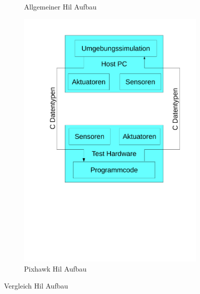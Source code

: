 \begin{figure}[ht]
\begin{center}
\begin{subfigure}{0.49\textwidth}
\begin{center}
		\caption{Allgemeiner Hil Aufbau}
		\label{fig:hil_normal}
		\end{center}
		\end{subfigure}
		\begin{subfigure}{0.49\textwidth}
		\begin{center}
		\includegraphics[height=0.33\paperheight, trim={3cm 9.5cm 1.5cm 2cm},clip]{pic/35_hil/hil_2.pdf}
		\caption{Pixhawk Hil Aufbau}
		\label{fig:hil_pixhawk}
		\end{center}
		\end{subfigure}
		\caption{Vergleich Hil Aufbau}
		\label{fig:hil_vergleich}
	\end{center}
\end{figure}

